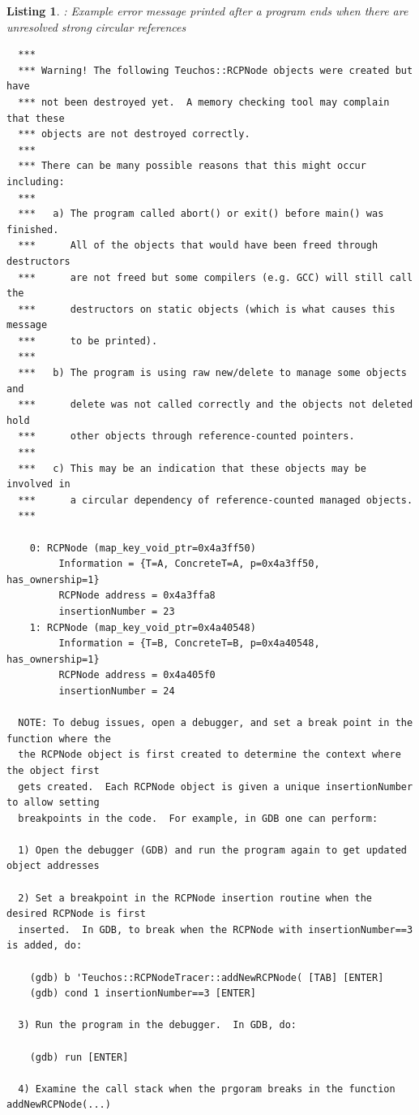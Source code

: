 \documentclass[pdf,ps2pdf,11pt]{SANDreport}
\newtheorem{listing}{Listing}
\begin{document}
{}\begin{listing}: Example error message printed after a program ends
when there are unresolved strong circular references
\label{listing:curcular-ref-error-msg}
{\small\begin{verbatim}
  ***
  *** Warning! The following Teuchos::RCPNode objects were created but have
  *** not been destroyed yet.  A memory checking tool may complain that these
  *** objects are not destroyed correctly.
  ***
  *** There can be many possible reasons that this might occur including:
  ***
  ***   a) The program called abort() or exit() before main() was finished.
  ***      All of the objects that would have been freed through destructors
  ***      are not freed but some compilers (e.g. GCC) will still call the
  ***      destructors on static objects (which is what causes this message
  ***      to be printed).
  ***
  ***   b) The program is using raw new/delete to manage some objects and
  ***      delete was not called correctly and the objects not deleted hold
  ***      other objects through reference-counted pointers.
  ***
  ***   c) This may be an indication that these objects may be involved in
  ***      a circular dependency of reference-counted managed objects.
  ***
  
    0: RCPNode (map_key_void_ptr=0x4a3ff50)
         Information = {T=A, ConcreteT=A, p=0x4a3ff50, has_ownership=1}
         RCPNode address = 0x4a3ffa8
         insertionNumber = 23
    1: RCPNode (map_key_void_ptr=0x4a40548)
         Information = {T=B, ConcreteT=B, p=0x4a40548, has_ownership=1}
         RCPNode address = 0x4a405f0
         insertionNumber = 24
 
  NOTE: To debug issues, open a debugger, and set a break point in the function where the
  the RCPNode object is first created to determine the context where the object first
  gets created.  Each RCPNode object is given a unique insertionNumber to allow setting
  breakpoints in the code.  For example, in GDB one can perform:
  
  1) Open the debugger (GDB) and run the program again to get updated object addresses
   
  2) Set a breakpoint in the RCPNode insertion routine when the desired RCPNode is first
  inserted.  In GDB, to break when the RCPNode with insertionNumber==3 is added, do:
   
    (gdb) b 'Teuchos::RCPNodeTracer::addNewRCPNode( [TAB] [ENTER]
    (gdb) cond 1 insertionNumber==3 [ENTER]
  
  3) Run the program in the debugger.  In GDB, do:
  
    (gdb) run [ENTER]
  
  4) Examine the call stack when the prgoram breaks in the function addNewRCPNode(...)
\end{verbatim}}
\end{listing}
  
\end{document}
